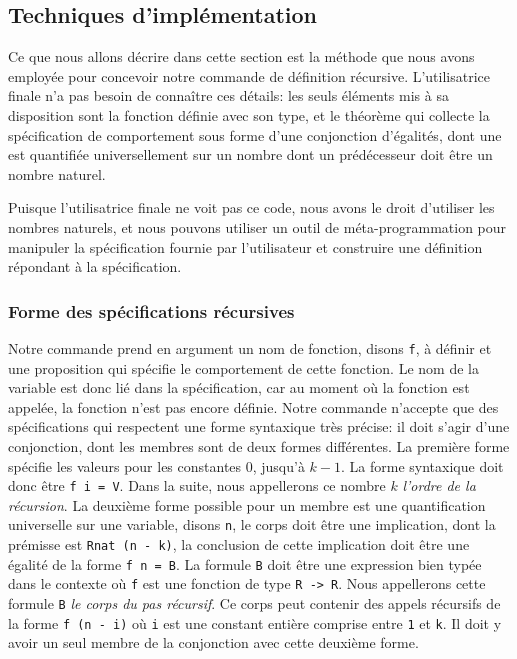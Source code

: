 \documentclass[draft]{jflart}
\begin{document}
\subsection{Techniques d'implémentation}
Ce que nous allons décrire dans cette section est la méthode que nous avons
employée pour concevoir notre commande de définition récursive.
L'utilisatrice finale n'a pas besoin de connaître ces détails: les
seuls éléments mis à sa disposition sont la fonction définie avec son
type, et le théorème qui collecte la spécification de comportement
sous forme d'une conjonction d'égalités, dont une est quantifiée
universellement sur un nombre dont un prédécesseur doit être un nombre
naturel.

Puisque l'utilisatrice finale ne voit pas ce code, nous avons le droit
d'utiliser les nombres naturels, et nous pouvons utiliser un outil de
méta-programmation pour manipuler la spécification fournie par
l'utilisateur et construire une définition répondant à la
spécification.

\subsubsection{Forme des spécifications récursives}
Notre commande prend en argument un nom de fonction, disons \texttt{f},
à définir et une
proposition qui spécifie le comportement de cette fonction.  Le nom de
la variable est donc lié dans la spécification, car au moment où la
fonction est appelée, la fonction n'est pas encore définie.  Notre
commande n'accepte que des spécifications qui respectent une forme
syntaxique très précise: il doit s'agir d'une conjonction, dont les
membres sont de deux formes différentes.  La première forme spécifie
les valeurs pour les constantes \(0\), jusqu'à \(k - 1\).  La forme
syntaxique doit donc être \texttt{f i = V}.  Dans la suite, nous
appellerons ce nombre \(k\) {\em l'ordre de la récursion}.
La deuxième forme possible
pour un membre est une quantification universelle sur une variable,
disons \texttt{n}, le corps doit être une implication, dont la prémisse
est \texttt{Rnat (n - k)}, la conclusion de cette implication doit être
une égalité de la forme \texttt{f n = B}.  La formule \texttt{B} doit être
une expression bien typée dans le contexte où \texttt{f} est une fonction
de type \texttt{R -> R}.  Nous appellerons cette formule \texttt{B} {\em le
  corps du pas récursif}.
Ce corps peut contenir des appels récursifs de
la forme \texttt{f (n - i)} où \texttt{i} est une constant entière comprise
  entre \texttt{1} et \texttt{k}.  Il doit y avoir un seul membre de la
  conjonction avec cette deuxième forme.
\end{document}
